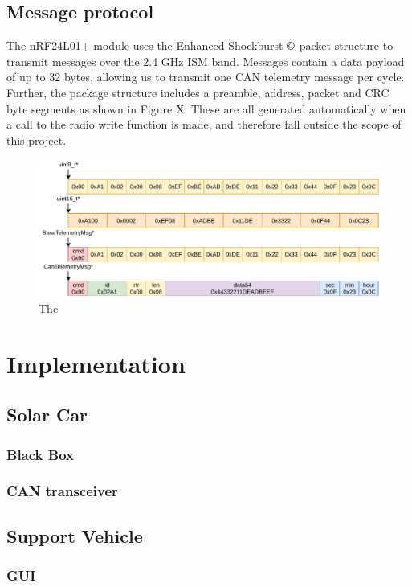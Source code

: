 \documentclass[conference]{IEEEtran}
\begin{document}
\subsection{Message protocol}
The nRF24L01+ module uses the Enhanced Shockburst $\copyright$ packet structure to transmit messages over the 2.4 GHz ISM band. Messages contain a data payload of up to 32 bytes, allowing us to transmit one CAN telemetry message per cycle. Further, the package structure includes a preamble, address, packet and CRC byte segments as shown in Figure X. These are all generated automatically when a call to the radio write function is made, and therefore fall outside the scope of this project.   

\begin{figure}
    \centering
    \includegraphics[width=\linewidth]{documentation/images/MessageTypes.pdf}
    \caption{The }
    \label{fig:my_label}
\end{figure}

\section{Implementation}

\subsection{Solar Car} 
\subsubsection{Black Box} %
\subsubsection{CAN transceiver}
\subsection{Support Vehicle}
\subsubsection{GUI} %
\end{document}
